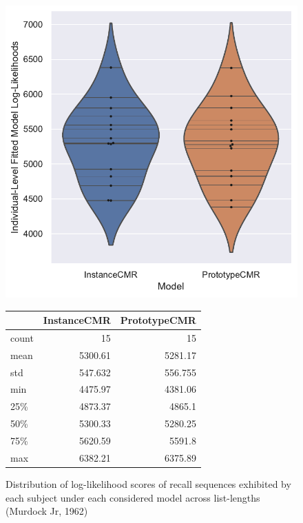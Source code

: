 \documentclass[
  letterpaper,
]{article}
\begin{document}
\begin{figure}

\begin{minipage}[c]{\linewidth}

{\centering 

\includegraphics{./figures/individual_murdock1962.pdf}

}

\end{minipage}%
\newline
\begin{minipage}[c]{\linewidth}

{\centering 

\begin{longtable}[]{@{}lrr@{}}
\toprule()
& InstanceCMR & PrototypeCMR \\
\midrule()
\endhead
count & 15 & 15 \\
mean & 5300.61 & 5281.17 \\
std & 547.632 & 556.755 \\
min & 4475.97 & 4381.06 \\
25\% & 4873.37 & 4865.1 \\
50\% & 5300.33 & 5280.25 \\
75\% & 5620.59 & 5591.8 \\
max & 6382.21 & 6375.89 \\
\bottomrule()
\end{longtable}

}

\end{minipage}%

\caption{\label{fig-murdokafits}Distribution of log-likelihood scores of
recall sequences exhibited by each subject under each considered model
across list-lengths (Murdock Jr, 1962)}

\end{figure}
\end{document}
